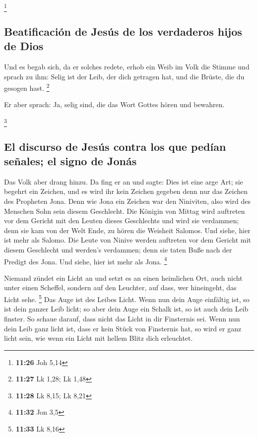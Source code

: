 \footnote{\textbf{11:26} Joh 5,14}

\hypertarget{beatificaciuxf3n-de-jesuxfas-de-los-verdaderos-hijos-de-dios}{%
\subsection{Beatificación de Jesús de los verdaderos hijos de
Dios}\label{beatificaciuxf3n-de-jesuxfas-de-los-verdaderos-hijos-de-dios}}

 Und es begab sich, da er solches redete, erhob ein Weib
im Volk die Stimme und sprach zu ihm: Selig ist der Leib, der dich
getragen hat, und die Brüste, die du gesogen hast. \footnote{\textbf{11:27}
  Lk 1,28; Lk 1,48}

 Er aber sprach: Ja, selig sind, die das Wort Gottes
hören und bewahren.

\footnote{\textbf{11:28} Lk 8,15; Lk 8,21}

\hypertarget{el-discurso-de-jesuxfas-contra-los-que-peduxedan-seuxf1ales-el-signo-de-jonuxe1s}{%
\subsection{El discurso de Jesús contra los que pedían señales; el signo
de
Jonás}\label{el-discurso-de-jesuxfas-contra-los-que-peduxedan-seuxf1ales-el-signo-de-jonuxe1s}}

 Das Volk aber drang hinzu. Da fing er an und sagte: Dies
ist eine arge Art; sie begehrt ein Zeichen, und es wird ihr kein Zeichen
gegeben denn nur das Zeichen des Propheten Jona.  Denn
wie Jona ein Zeichen war den Niniviten, also wird des Menschen Sohn sein
diesem Geschlecht.  Die Königin von Mittag wird auftreten
vor dem Gericht mit den Leuten dieses Geschlechts und wird sie
verdammen; denn sie kam von der Welt Ende, zu hören die Weisheit
Salomos. Und siehe, hier ist mehr als Salomo.  Die Leute
von Ninive werden auftreten vor dem Gericht mit diesem Geschlecht und
werden's verdammen; denn sie taten Buße nach der Predigt des Jona. Und
siehe, hier ist mehr als Jona. \footnote{\textbf{11:32} Jon 3,5}

 Niemand zündet ein Licht an und setzt es an einen
heimlichen Ort, auch nicht unter einen Scheffel, sondern auf den
Leuchter, auf dass, wer hineingeht, das Licht sehe. \footnote{\textbf{11:33}
  Lk 8,16}  Das Auge ist des Leibes Licht. Wenn nun dein
Auge einfältig ist, so ist dein ganzer Leib licht; so aber dein Auge ein
Schalk ist, so ist auch dein Leib finster.  So schaue
darauf, dass nicht das Licht in dir Finsternis sei.  Wenn
nun dein Leib ganz licht ist, dass er kein Stück von Finsternis hat, so
wird er ganz licht sein, wie wenn ein Licht mit hellem Blitz dich
erleuchtet.

